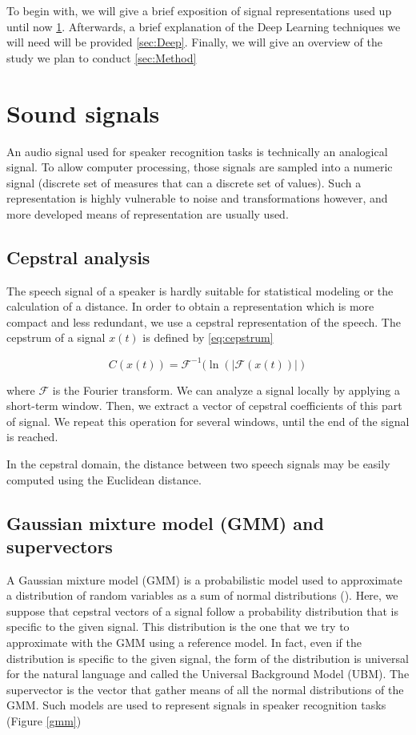 \documentclass[conference]{IEEEtran}
\begin{document}
To begin with, we will give a brief exposition of signal representations used
up until now \ref{sec:signal}. Afterwards, a brief explanation of the Deep
Learning techniques we will need will be provided \ref{sec:Deep}. Finally, we
will give an overview of the study we plan to conduct \ref{sec:Method}

\section{Sound signals}
\label{sec:signal}
An audio signal used for speaker recognition tasks is technically an analogical
signal. To allow computer processing, those signals are sampled into a numeric
signal (discrete set of measures that can a discrete set of values). Such a
representation is highly vulnerable to noise and transformations however,
and more developed means of representation are usually used.

\subsection{Cepstral analysis}

The speech signal of a speaker is hardly suitable for statistical modeling or
the calculation of a distance.
In order to obtain a representation which is more compact and less redundant, we
use a cepstral representation of the speech.
The cepstrum of a signal $x(t)$ is defined by \eqref{eq:cepstrum}

\begin{equation}
  C(x(t)) = \mathcal{F}^{-1}(\ln(|\mathcal{F}(x(t))|)
   \label{eq:cepstrum}
\end{equation}

where $\mathcal{F}$ is the Fourier transform.
We can analyze a signal locally by applying a short-term window. Then, we
extract a vector of cepstral coefficients of this part of signal. We repeat
this operation for several windows, until the end of the signal is reached.

In the cepstral domain, the distance between two speech signals may be easily
computed using the Euclidean distance.


\subsection{Gaussian mixture model (GMM) and supervectors}

A Gaussian mixture model (GMM) is a probabilistic model used to approximate a
distribution of random variables as a sum of normal distributions (\cite{Bimbot2004}).
Here, we suppose that cepstral vectors of a signal follow a probability
distribution that is specific to the given signal. This distribution is the one
that we try to approximate with the GMM using a reference model. In fact, even
if the distribution is specific to the given signal, the form of the
distribution is universal for the natural language and called the Universal
Background Model (UBM). The supervector is the vector that gather means of
all the normal distributions of the GMM. Such models are used to represent
signals in speaker recognition tasks (Figure \ref{gmm})\\
\end{document}
